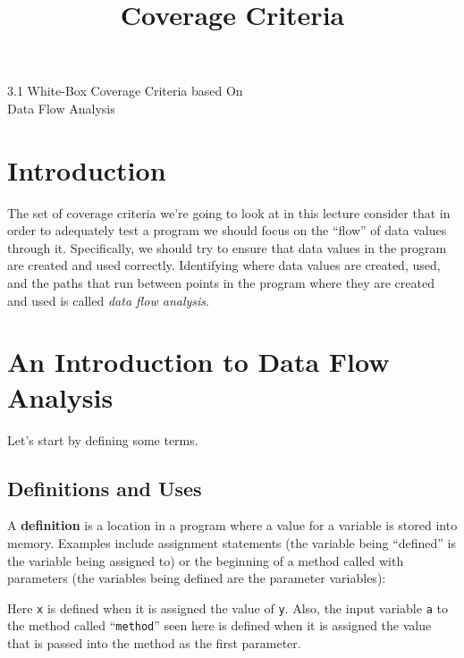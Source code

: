 



\title{Coverage Criteria}{3.1 White-Box Coverage Criteria based On \\ Data Flow Analysis}



\section{Introduction}

The set of coverage criteria we're going to look at in this lecture consider
that in order to adequately test a program we should focus on the ``flow'' of
data values through it. Specifically, we should try to ensure that data values
in the program are created and used correctly. Identifying where data values are
created, used, and the paths that run between points in the program where they
are created and used is called {\it data flow analysis}. 


\section{An Introduction to Data Flow Analysis}

Let's start by defining some terms.

\subsection{Definitions and Uses}

A {\bf definition} is a location in a program where a value for a variable is
stored into memory. Examples include assignment statements (the variable being
``defined'' is the variable being assigned to) or the beginning of a method called
with parameters (the variables being defined are the parameter variables):

\begin{center} 
\end{center}   


Here {\tt x} is defined when it is assigned the value of {\tt y}. Also, the
input variable {\tt a} to the method called ``{\tt method}'' seen here is
defined when it is assigned the value that is passed into the method as the
first parameter.

